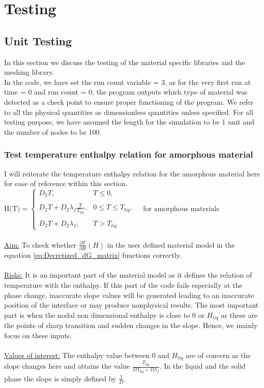 \chapter{Testing\label{cha:chapter4}}
\section{Unit Testing}
In this section we discuss the testing of the material specific libraries and the meshing library.\\
In the code, we have set the run count variable = 3, as for the very first run at time = 0 and run count = 0, the program outputs which type of material was detected as a check point to ensure proper functioning of the program. We refer to all the physical quantities as dimensionless quantities unless specified. For all testing purpose, we have assumed the length for the simulation to be 1 unit and the number of nodes to be 100.
\subsection{Test temperature enthalpy relation for amorphous material}
I will reiterate the temperature enthalpy relation for the amorphous material here for ease of reference within this section.\\ 
$\text{H(T)} =
\begin{cases}
D_2 T, & T \leq 0, \\ \\
D_2 T+ D_2 \lambda_f \frac{T}{T_{liq}}, & 0 \leq T \leq T_{liq}, \\ \\
D_2 T + D_2\lambda_f, & T > T_{liq}
\end{cases}\quad\text{for amorphous materials}$\\ \\
\underline{Aim:} To check whether $\frac{\partial T}{\partial H}(H)$ in the user defined material model in the equation \ref{eq:Decretized_dG_matrix} functions correctly.\\ \\
\underline{Risks:} It is an important part of the material model as it defines the relation of temperature with the enthalpy. If this part of the code fails especially at the phase change, inaccurate slope values will be generated leading to an inaccurate position of the interface or may produce nonphysical results. The most important part is when the nodal non dimensional enthalpy is close to 0 or $H_{liq}$ as these are the points of sharp transition and sudden changes in the slope. Hence, we mainly focus on these inputs.\\ \\
\underline{Values of interest:} The enthalpy value between 0 and $H_{liq}$ are of concern as the slope changes here and attains the value $\frac{T_{\text{liq}}}{D T_{\text{liq}} + D \lambda_{f}}$. In the liquid and the solid phase the slope is simply defined by $\frac{1}{D}$. \\

